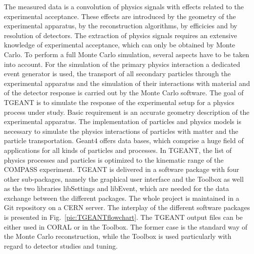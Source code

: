 The measured data is a convolution of physics signals with effects related to the experimental acceptance. These effects are introduced by the geometry of the experimental apparatus, by the reconstruction algorithms, by efficicies and by resolution of detectors. The extraction of physics signals requires an extensive knowledge of experimental acceptance, which can only be obtained by Monte Carlo.
To perform a full Monte Carlo simulation, several aspects have to be taken into account. For the simulation of the primary physics interaction a dedicated event generator is used, the transport of all secondary particles through the experimental apparatus and the simulation of their interactions with material and of the detector response is carried out by the Monte Carlo software.
The goal of TGEANT is to simulate the response of the experimental setup for a physics process under study. Basic requirement is an accurate geometry description of the experimental apparatus. The implementation of particles and physics models is necessary to simulate the physics interactions of particles with matter and the particle transportation. Geant$4$ offers data bases, which comprise a huge field of applications for all kinds of particles and processes. In TGEANT, the list of physics processes and particles is optimized to the kinematic range of the COMPASS experiment.
TGEANT is delivered in a software package with four other sub-packages, namely the graphical user interface and the Toolbox as well as the two libraries libSettings and libEvent, which are needed for the data exchange between the different packages. The whole project is maintained in a Git repository on a CERN server. The interplay of the different software packages is presented in Fig.~\ref{pic:TGEANTflowchart}. The TGEANT output files can be either used in CORAL or in the Toolbox. The former case is the standard way of the Monte Carlo reconstruction, while the Toolbox is used particularly with regard to detector studies and tuning.

